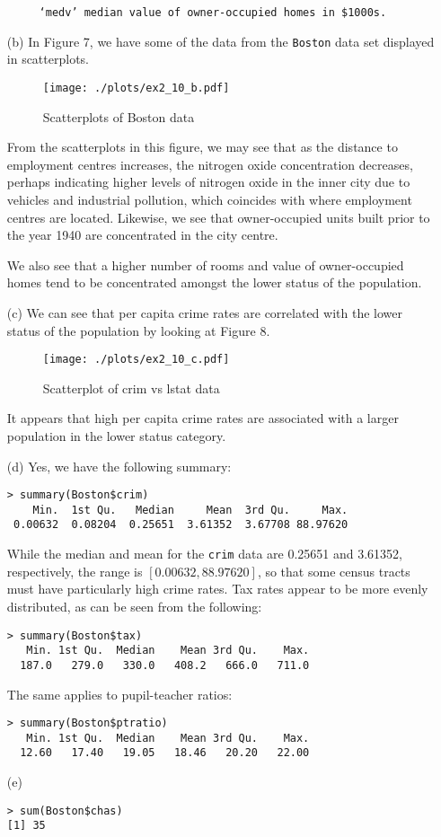 \begin{itemize}
\begin{verbatim}
     ‘medv’ median value of owner-occupied homes in $1000s.
    \end{verbatim}
    \item[(b)] In Figure 7, we have some of the data from the \verb|Boston| data
    set displayed in scatterplots.\par
    \begin{figure}[!ht]
        \texttt{[image: ./plots/ex2\_10\_b.pdf]}
        \caption{Scatterplots of Boston data}
    \end{figure}
    \qquad From the scatterplots in this figure, we may see that as the distance to 
    employment centres increases, the nitrogen oxide concentration decreases,
    perhaps indicating higher levels of nitrogen oxide in the inner city due
    to vehicles and industrial pollution, which coincides with where employment
    centres are located. Likewise, we see that owner-occupied units built prior
    to the year 1940 are concentrated in the city centre.\par
    \qquad We also see that a higher number of rooms and value of owner-occupied 
    homes tend to be concentrated amongst the lower status of the population.
    \item[(c)] We can see that per capita crime rates are correlated with the
    lower status of the population by looking at Figure 8.
    \begin{figure}[!ht]
        \texttt{[image: ./plots/ex2\_10\_c.pdf]}
        \caption{Scatterplot of crim vs lstat data}
    \end{figure}
    It appears that high per capita crime rates are associated with a 
    larger population in the lower status category.
    \item[(d)] Yes, we have the following summary:
    \begin{verbatim}
> summary(Boston$crim)
    Min.  1st Qu.   Median     Mean  3rd Qu.     Max.
 0.00632  0.08204  0.25651  3.61352  3.67708 88.97620
    \end{verbatim}
    While the median and mean for the \verb|crim| data are 
    0.25651 and 3.61352, respectively, the range is $[0.00632, 88.97620]$,
    so that some census tracts must have particularly high crime rates.
    Tax rates appear to be more evenly distributed, as can be seen from the
    following:
    \begin{verbatim}
> summary(Boston$tax)
   Min. 1st Qu.  Median    Mean 3rd Qu.    Max.
  187.0   279.0   330.0   408.2   666.0   711.0
    \end{verbatim}
    The same applies to pupil-teacher ratios:
    \begin{verbatim}
> summary(Boston$ptratio)
   Min. 1st Qu.  Median    Mean 3rd Qu.    Max.
  12.60   17.40   19.05   18.46   20.20   22.00
    \end{verbatim}
    \item[(e)]
    \begin{verbatim}
> sum(Boston$chas)
[1] 35
    \end{verbatim}
\end{itemize}
